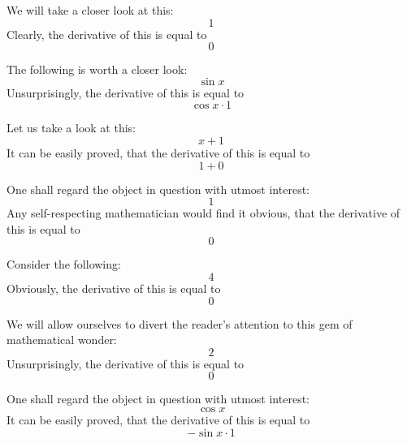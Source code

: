 \documentclass{article}
\begin{document}
We will take a closer look at this:
\begin{equation}
1 
\end{equation}
Clearly, the derivative of this is equal to
\begin{equation}
0 
\end{equation}

The following is worth a closer look:
\begin{equation}
\sin x 
\end{equation}
Unsurprisingly, the derivative of this is equal to
\begin{equation}
\cos x \cdot 1 
\end{equation}

Let us take a look at this:
\begin{equation}
x + 1 
\end{equation}
It can be easily proved, that the derivative of this is equal to
\begin{equation}
1 + 0 
\end{equation}

One shall regard the object in question with utmost interest:
\begin{equation}
1 
\end{equation}
Any self-respecting mathematician would find it obvious, that the derivative of this is equal to
\begin{equation}
0 
\end{equation}

Consider the following:
\begin{equation}
4 
\end{equation}
Obviously, the derivative of this is equal to
\begin{equation}
0 
\end{equation}

We will allow ourselves to divert the reader's attention to this gem of mathematical wonder:
\begin{equation}
2 
\end{equation}
Unsurprisingly, the derivative of this is equal to
\begin{equation}
0 
\end{equation}

One shall regard the object in question with utmost interest:
\begin{equation}
\cos x 
\end{equation}
It can be easily proved, that the derivative of this is equal to
\begin{equation}
-\sin x \cdot 1 
\end{equation}
\end{document}
